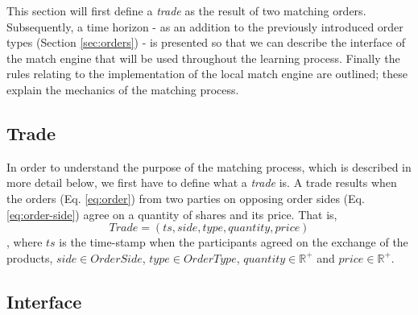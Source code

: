 This section will first define a \textit{trade} as the result of two matching orders.
Subsequently, a time horizon - as an addition to the previously introduced order types (Section \ref{sec:orders}) - is presented so that we can describe the interface of the match engine that will be used throughout the learning process.
Finally the rules relating to the implementation of the local match engine are outlined; these  explain the mechanics of the matching process.

\subsection{Trade}

In order to understand the purpose of the matching process, which is described in more detail below, we first have to define what a \textit{trade} is.
A trade results when the orders (Eq. \ref{eq:order}) from two parties on opposing order sides (Eq. \ref{eq:order-side}) agree on a quantity of shares and its price.
That is,
\begin{equation}\label{eq:trade}
    Trade=(ts, side, type, quantity, price )
\end{equation}
, where $ts$ is the time-stamp when the participants agreed on the exchange of the products, $side \in OrderSide$, $type \in OrderType$, $quantity \in \mathbb{R^+}$ and $price \in \mathbb{R^+}$.

\subsection{Interface}
\label{sec:match-engine-interface}

